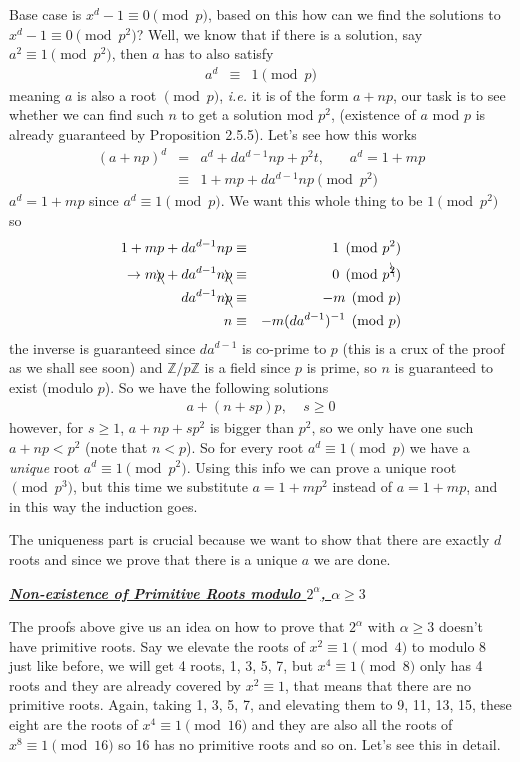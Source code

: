 \documentclass[aps,preprint,preprintnumbers,nofootinbib,showpacs,prd]{revtex4-1}
\newcommand{\ie}{{\it i.e.} }
\newcommand{\nbea}{\begin{eqnarray*}}
\newcommand{\neea}{\end{eqnarray*}}
\begin{document}
Base case is $x^d - 1\equiv 0 \pmod{p}$, based on this how can we find the solutions to $x^d - 1\equiv 0 \pmod{p^2}$? Well, we know that if there is a solution, say $a^2 \equiv 1 \pmod{p^2}$, then $a$ has to also satisfy
%
\nbea
a^d & \equiv & 1 \pmod{p}
\neea
%
meaning $a$ is also a root $\pmod{p}$, \ie it is of the form $a + np$, our task is to see whether we can find such $n$ to get a solution mod $p^2$, (existence of $a$ mod $p$ is already guaranteed by Proposition 2.5.5). Let's see how this works
%
\nbea
(a + np)^d & = & a^d + da^{d-1}np + p^2 t, ~~~~~~~~ a^d = 1 + mp \\
& \equiv & 1 + mp + da^{d-1}np \pmod{p^2}
\neea
%
$a^d = 1 + mp$ since $a^d \equiv 1 \pmod{p}$. We want this whole thing to be $1 \pmod{p^2}$ so
%
\nbea
1 + mp + da^{d-1}np & \equiv & 1 \pmod{p^2} \\
\to m\bcancel{p} + da^{d-1}n\bcancel{p} & \equiv & 0 \pmod{p^{\bcancel{2}}} \\
da^{d-1}n\bcancel{p} & \equiv & -m \pmod{p} \\
n & \equiv & -m(da^{d-1})^{-1} \pmod{p}
\neea
%
the inverse is guaranteed since $da^{d-1}$ is co-prime to $p$ (this is a crux of the proof as we shall see soon) and $\mathbb{Z}/p\mathbb{Z}$ is a field since $p$ is prime, so $n$ is guaranteed to exist (modulo $p$). So we have the following solutions 
%
\nbea
a + (n + sp)p, ~~~~~ s \ge 0
\neea
%
however, for $s \ge 1$, $a + np + sp^2$ is bigger than $p^2$, so we only have one such $a + np < p^2$ (note that $n < p$). So for every root $a^d \equiv 1 \pmod{p}$ we have a {\it unique} root $a^d \equiv 1 \pmod{p^2}$. Using this info we can prove a unique root $\pmod{p^3}$, but this time we substitute $a = 1 +mp^2$ instead of $a = 1 + mp$, and in this way the induction goes.

The uniqueness part is crucial because we want to show that there are exactly $d$ roots and since we prove that there is a unique $a$ we are done.

\bigskip
\underline{\textbf{\textit{Non-existence of Primitive Roots modulo $2^\alpha$, $\alpha \ge 3$}}}
\smallskip

The proofs above give us an idea on how to prove that $2^\alpha$ with $\alpha \ge 3$ doesn't have primitive roots. Say we elevate the roots of $x^2 \equiv 1 \pmod{4}$ to modulo 8 just like before, we will get 4 roots, 1, 3, 5, 7, but $x^4 \equiv 1 \pmod{8}$ only has 4 roots and they are already covered by $x^2 \equiv 1$, that means that there are no primitive roots. Again, taking 1, 3, 5, 7, and elevating them to 9, 11, 13, 15, these eight are the roots of $x^4 \equiv 1 \pmod{16}$ and they are also all the roots of $x^8 \equiv 1\pmod{16}$ so 16 has no primitive roots and so on. Let's see this in detail. 
\end{document}
